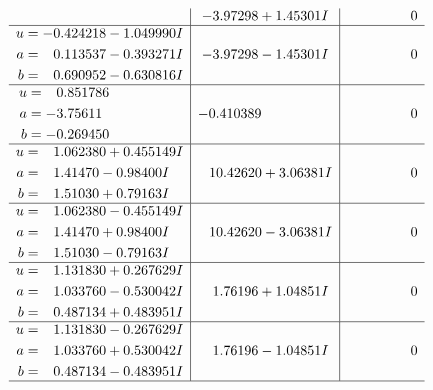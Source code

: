 \documentclass[1p]{elsarticle_modified}
\theoremstyle{definition}
\begin{document}
$$\begin{array}{c|c|c}
 & -3.97298 + 1.45301 I & \phantom{-0.000000 } 0 \\ \hline\begin{aligned}
u &= -0.424218 - 1.049990 I \\
a &= \phantom{-}0.113537 - 0.393271 I \\
b &= \phantom{-}0.690952 - 0.630816 I\end{aligned}
 & -3.97298 - 1.45301 I & \phantom{-0.000000 } 0 \\ \hline\begin{aligned}
u &= \phantom{-}0.851786\phantom{ +0.000000I} \\
a &= -3.75611\phantom{ +0.000000I} \\
b &= -0.269450\phantom{ +0.000000I}\end{aligned}
 & -0.410389\phantom{ +0.000000I} & \phantom{-0.000000 } 0 \\ \hline\begin{aligned}
u &= \phantom{-}1.062380 + 0.455149 I \\
a &= \phantom{-}1.41470 - 0.98400 I \\
b &= \phantom{-}1.51030 + 0.79163 I\end{aligned}
 & \phantom{-}10.42620 + 3.06381 I & \phantom{-0.000000 } 0 \\ \hline\begin{aligned}
u &= \phantom{-}1.062380 - 0.455149 I \\
a &= \phantom{-}1.41470 + 0.98400 I \\
b &= \phantom{-}1.51030 - 0.79163 I\end{aligned}
 & \phantom{-}10.42620 - 3.06381 I & \phantom{-0.000000 } 0 \\ \hline\begin{aligned}
u &= \phantom{-}1.131830 + 0.267629 I \\
a &= \phantom{-}1.033760 - 0.530042 I \\
b &= \phantom{-}0.487134 + 0.483951 I\end{aligned}
 & \phantom{-}1.76196 + 1.04851 I & \phantom{-0.000000 } 0 \\ \hline\begin{aligned}
u &= \phantom{-}1.131830 - 0.267629 I \\
a &= \phantom{-}1.033760 + 0.530042 I \\
b &= \phantom{-}0.487134 - 0.483951 I\end{aligned}
 & \phantom{-}1.76196 - 1.04851 I & \phantom{-0.000000 } 0\\
 \hline 
 \end{array}$$\newpage$$\begin{array}{c|c|c}  

\end{array}$$
\end{document}

